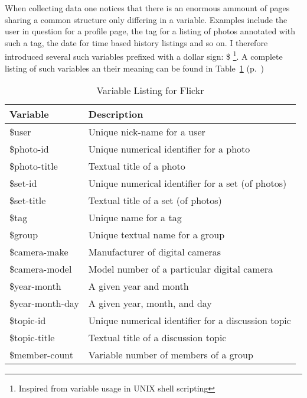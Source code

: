 \documentclass[12pt,a4paper]{article}
\begin{document}
When collecting data one notices that there is an enormous ammount of pages
sharing a common structure only differing in a variable. Examples include
the user in question for a profile page, the tag for a listing of photos
annotated with such a tag, the date for time based history listings and so on.
I therefore introduced several such variables prefixed with a dollar sign: \$
\footnote{Inspired from variable usage in UNIX shell scripting}. A complete
listing of such variables an their meaning can be found in
Table~\ref{table:flickr.variable.list}
(p.~\pageref{table:flickr.variable.list})

\begin{table}[h!b!p!]
  \caption{Variable Listing for Flickr}
  \label{table:flickr.variable.list}
  \begin{center}
    \begin{tabular}{l|l}

      Variable &
      Description \\

      \hline

      \$user &
      Unique nick-name for a user \\

      \$photo-id &
      Unique numerical identifier for a photo \\

      \$photo-title &
      Textual title of a photo \\

      \$set-id &
      Unique numerical identifier for a set (of photos) \\

      \$set-title &
      Textual title of a set (of photos) \\

      \$tag &
      Unique name for a tag \\

      \$group &
      Unique textual name for a group \\

      \$camera-make &
      Manufacturer of digital cameras \\

      \$camera-model &
      Model number of a particular digital camera \\

      \$year-month &
      A given year and month \\

      \$year-month-day &
      A given year, month, and day \\

      \$topic-id &
      Unique numerical identifier for a discussion topic \\

      \$topic-title &
      Textual title of a discussion topic \\

      \$member-count &
      Variable number of members of a group \\

    \end{tabular}
  \end{center}
\end{table}
\end{document}
